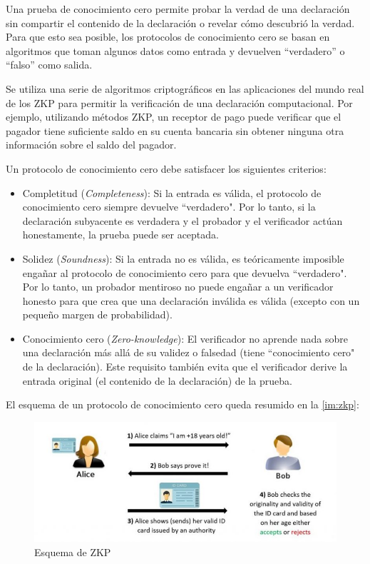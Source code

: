 Una prueba de conocimiento cero permite probar la verdad de una declaración sin compartir el contenido de la declaración o revelar cómo descubrió la verdad. Para que esto sea posible, los protocolos de conocimiento cero se basan en algoritmos que toman algunos datos como entrada y devuelven ``verdadero'' o ``falso'' como salida.

Se utiliza una serie de algoritmos criptográficos en las aplicaciones del mundo real de los ZKP para permitir la verificación de una declaración computacional. Por ejemplo, utilizando métodos ZKP, un receptor de pago puede verificar que el pagador tiene suficiente saldo en su cuenta bancaria sin obtener ninguna otra información sobre el saldo del pagador.

Un protocolo de conocimiento cero debe satisfacer los siguientes criterios:
\begin{itemize}
    \item Completitud (\emph{Completeness}): Si la entrada es válida, el protocolo de conocimiento cero siempre devuelve ``verdadero". Por lo tanto, si la declaración subyacente es verdadera y el probador y el verificador actúan honestamente, la prueba puede ser aceptada.

    \item Solidez (\emph{Soundness}): Si la entrada no es válida, es teóricamente imposible engañar al protocolo de conocimiento cero para que devuelva ``verdadero". Por lo tanto, un probador mentiroso no puede engañar a un verificador honesto para que crea que una declaración inválida es válida (excepto con un pequeño margen de probabilidad).

    \item Conocimiento cero (\emph{Zero-knowledge}): El verificador no aprende nada sobre una declaración más allá de su validez o falsedad (tiene ``conocimiento cero" de la declaración). Este requisito también evita que el verificador derive la entrada original (el contenido de la declaración) de la prueba.
\end{itemize}

El esquema de un protocolo de conocimiento cero queda resumido en la \autoref{im:zkp}:
\begin{figure}[ht]
    \centering
    \includegraphics[width=\textwidth]{images/zkp.jpg}
    \caption{Esquema de ZKP \cite{ZKP}}
    \label{im:zkp}
\end{figure}

